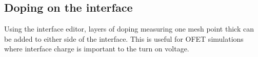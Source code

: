 \subsection{Doping on the interface}
Using the interface editor, layers of doping measuring one mesh point thick can be added to either side of the interface.  This is useful for OFET simulations where interface charge is important to the turn on voltage.
